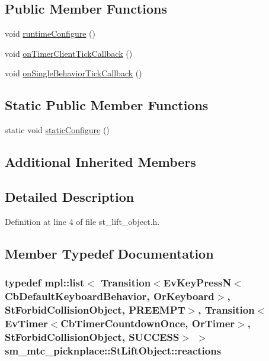 \subsection*{Public Member Functions}
\begin{DoxyCompactItemize}
\item 
void \hyperlink{structsm__mtc__picknplace_1_1StLiftObject_a6485b79496fbde83944bb5a6f96403f4}{runtime\+Configure} ()
\item 
void \hyperlink{structsm__mtc__picknplace_1_1StLiftObject_ae60a55b71a362721f22d867809928b26}{on\+Timer\+Client\+Tick\+Callback} ()
\item 
void \hyperlink{structsm__mtc__picknplace_1_1StLiftObject_a4dff1ab1c520be6fb40b7c3f783a4e84}{on\+Single\+Behavior\+Tick\+Callback} ()
\end{DoxyCompactItemize}
\subsection*{Static Public Member Functions}
\begin{DoxyCompactItemize}
\item 
static void \hyperlink{structsm__mtc__picknplace_1_1StLiftObject_add7985f5960343fa7f3a3c9d06eaf849}{static\+Configure} ()
\end{DoxyCompactItemize}
\subsection*{Additional Inherited Members}


\subsection{Detailed Description}


Definition at line 4 of file st\+\_\+lift\+\_\+object.\+h.



\subsection{Member Typedef Documentation}
\subsubsection[{\texorpdfstring{reactions}{reactions}}]{\setlength{\rightskip}{0pt plus 5cm}typedef mpl\+::list$<$ Transition$<$Ev\+Key\+PressN$<$Cb\+Default\+Keyboard\+Behavior, {\bf Or\+Keyboard}$>$, {\bf St\+Forbid\+Collision\+Object}, {\bf P\+R\+E\+E\+M\+PT}$>$, Transition$<$Ev\+Timer$<$Cb\+Timer\+Countdown\+Once, {\bf Or\+Timer}$>$, {\bf St\+Forbid\+Collision\+Object}, {\bf S\+U\+C\+C\+E\+SS}$>$ $>$ {\bf sm\+\_\+mtc\+\_\+picknplace\+::\+St\+Lift\+Object\+::reactions}}\hypertarget{structsm__mtc__picknplace_1_1StLiftObject_a2aed6ba4e045255d980eb99a087d950f}{}\label{structsm__mtc__picknplace_1_1StLiftObject_a2aed6ba4e045255d980eb99a087d950f}


